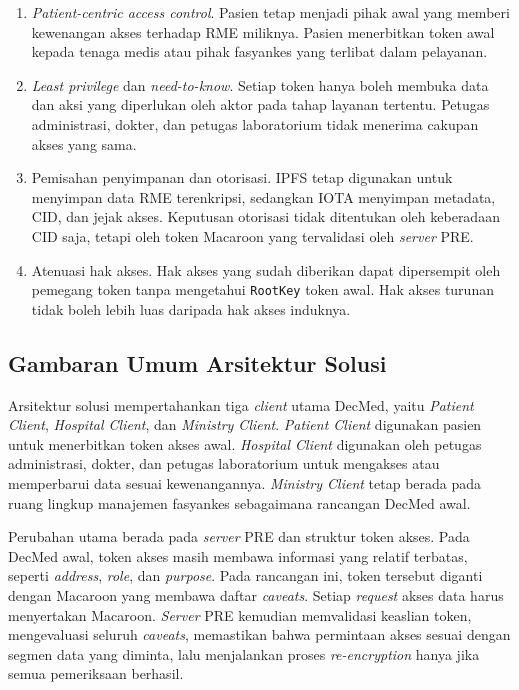 \begin{enumerate}[leftmargin=*]
	\item \textit{Patient-centric access control}. Pasien tetap menjadi pihak awal yang memberi kewenangan akses terhadap RME miliknya. Pasien menerbitkan token awal kepada tenaga medis atau pihak fasyankes yang terlibat dalam pelayanan.
	\item \textit{Least privilege} dan \textit{need-to-know}. Setiap token hanya boleh membuka data dan aksi yang diperlukan oleh aktor pada tahap layanan tertentu. Petugas administrasi, dokter, dan petugas laboratorium tidak menerima cakupan akses yang sama.
	\item Pemisahan penyimpanan dan otorisasi. IPFS tetap digunakan untuk menyimpan data RME terenkripsi, sedangkan IOTA menyimpan metadata, CID, dan jejak akses. Keputusan otorisasi tidak ditentukan oleh keberadaan CID saja, tetapi oleh token Macaroon yang tervalidasi oleh \textit{server} PRE.
	\item Atenuasi hak akses. Hak akses yang sudah diberikan dapat dipersempit oleh pemegang token tanpa mengetahui \texttt{RootKey} token awal. Hak akses turunan tidak boleh lebih luas daripada hak akses induknya.
\end{enumerate}

\subsection{Gambaran Umum Arsitektur Solusi}
\label{subsec:gambaran-umum-arsitektur-solusi}

Arsitektur solusi mempertahankan tiga \textit{client} utama DecMed, yaitu \textit{Patient Client}, \textit{Hospital Client}, dan \textit{Ministry Client}. \textit{Patient Client} digunakan pasien untuk menerbitkan token akses awal. \textit{Hospital Client} digunakan oleh petugas administrasi, dokter, dan petugas laboratorium untuk mengakses atau memperbarui data sesuai kewenangannya. \textit{Ministry Client} tetap berada pada ruang lingkup manajemen fasyankes sebagaimana rancangan DecMed awal.

Perubahan utama berada pada \textit{server} PRE dan struktur token akses. Pada DecMed awal, token akses masih membawa informasi yang relatif terbatas, seperti \textit{address}, \textit{role}, dan \textit{purpose}. Pada rancangan ini, token tersebut diganti dengan Macaroon yang membawa daftar \textit{caveats}. Setiap \textit{request} akses data harus menyertakan Macaroon. \textit{Server} PRE kemudian memvalidasi keaslian token, mengevaluasi seluruh \textit{caveats}, memastikan bahwa permintaan akses sesuai dengan segmen data yang diminta, lalu menjalankan proses \textit{re-encryption} hanya jika semua pemeriksaan berhasil.

